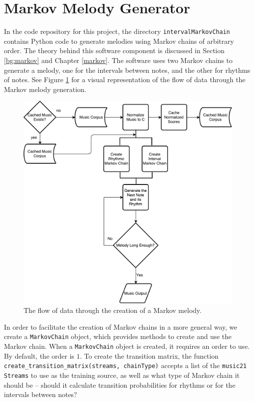 \section{Markov Melody Generator} \label{software:markov}

In the code repository for this project, the directory \texttt{intervalMarkovChain} contains Python code to generate melodies using Markov chains of arbitrary order.
The theory behind this software component is discussed in Section \ref{bg:markov} and Chapter \ref{markov}.
The software uses two Markov chains to generate a melody, one for the intervals between notes, and the other for rhythms of notes.
See Figure \ref{fig:markovflowchart} for a visual representation of the flow of data through the Markov melody generation.

\begin{figure}[h!]
	\centering
	\includegraphics[width=\linewidth]{figures/markov_flowchart.pdf}
	\caption{The flow of data through the creation of a Markov melody.}
	\label{fig:markovflowchart}
\end{figure}

In order to facilitate the creation of Markov chains in a more general way, we create a \texttt{MarkovChain} object, which provides methods to create and use the Markov chain.
When a \texttt{MarkovChain} object is created, it requires an order to use.
By default, the order is $1$.
To create the transition matrix, the function \texttt{create\_transition\_matrix(streams, chainType)} accepts a list of the \texttt{music21} \texttt{Streams} to use as the training source, as well as what type of Markov chain it should be -- should it calculate transition probabilities for rhythms or for the intervals between notes?

